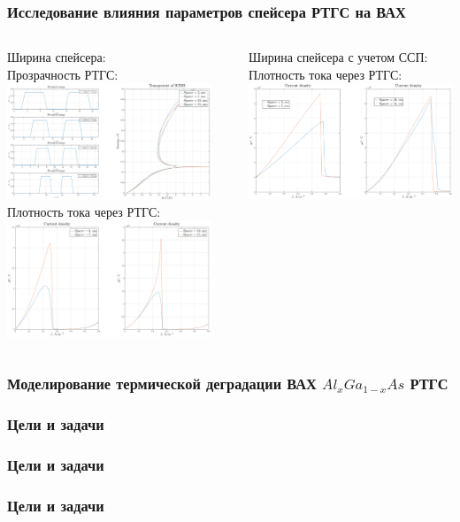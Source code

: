 \documentclass[10pt,pdf,hyperref={unicode},aspectratio={169}]{beamer}
\begin{document}
\begin{frame}
	\frametitle{Исследование влияния параметров спейсера РТГС на ВАХ}
	\begin{columns}
		{\color{blue} Ширина спейсера:}\\
		{\color{red} Прозрачность РТГС:}
	   	\includegraphics[width=.86\linewidth,center]{assets/qslt}\\
		{\color{red} Плотность тока через РТГС:}
	   	\includegraphics[width=.86\linewidth,center]{assets/qslj}
		\rule[-55mm]{0.2ex}{75mm}
		{\color{blue} Ширина спейсера с учетом ССП:}\\
		{\color{red} Плотность тока через РТГС:}
	   	\includegraphics[width=.88\linewidth,center]{assets/qslqj}
	   	\\[39mm]
		{\color{red} }
	\end{columns}
\end{frame}

\begin{frame}
	\frametitle{Моделирование термической деградации ВАХ $Al_{x}Ga_{1-x}As$ РТГС }
\end{frame}

\begin{frame}
	\frametitle{Цели и задачи}
\end{frame}

\begin{frame}
	\frametitle{Цели и задачи}
\end{frame}

\begin{frame}
	\frametitle{Цели и задачи}
\end{frame}
\end{document}
